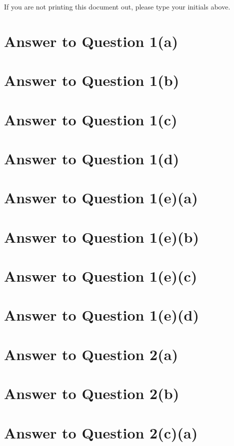 \documentclass[11pt]{article}
\begin{document}
If you are not printing this document out, please type your initials above.

\vfill
\vfill

\pagebreak[4]
\section*{Answer to Question 1(a)}

\section*{Answer to Question 1(b)}

\section*{Answer to Question 1(c)}

\section*{Answer to Question 1(d)}

\section*{Answer to Question 1(e)(a)}

\section*{Answer to Question 1(e)(b)}

\section*{Answer to Question 1(e)(c)}

\section*{Answer to Question 1(e)(d)}

\section*{Answer to Question 2(a)}

\section*{Answer to Question 2(b)}

\section*{Answer to Question 2(c)(a)}
\end{document}
